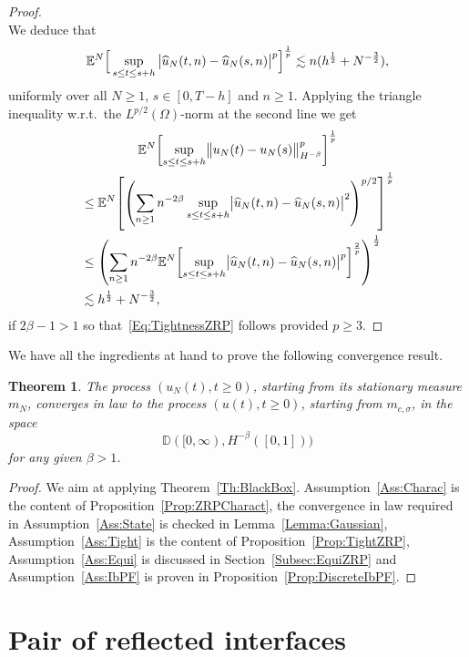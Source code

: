 \documentclass[10pt]{amsart}
\newtheorem{theo}{Theorem}[section]
\theoremstyle{definition}\newtheorem{defi}[theo]{Definition}\newtheorem{rema}[theo]{Remark}\newtheorem{exam}[theo]{Example}\newtheorem{exem}[theo]{Example}\newtheorem{nota}[theo]{Notation}
\theoremstyle{plain}
\newcommand{\bbD}{\mathbb{D}}
\newcommand{\bbE}{\mathbb{E}}
\let\oldhat\hat
\renewcommand*{\hat}[1]{\mathchoice{\widehat{#1}}{\widehat{#1}}{\oldhat{#1}}{\oldhat{#1}}}
\let\originalleft\left
\let\originalright\right
\renewcommand{\left}{\mathopen{}\mathclose\bgroup\originalleft}
\renewcommand{\right}{\aftergroup\egroup\originalright}
\begin{document}
\begin{proof}
\[\]
We deduce that
\begin{equation*}
\bbE^N \Big[\sup_{s\leq t \leq s+h} \big|\hat{u}_N(t,n)-\hat{u}_N(s,n)\big|^p\Big]^{\frac{1}{p}} \lesssim n(h^{\frac{1}{2}} + N^{-\frac{3}{2}}),
\end{equation*}
uniformly over all $N\geq 1$, $s\in [0,T-h]$ and $n\geq 1$. Applying the triangle inequality w.r.t.~the $L^{p/2}(\Omega)$-norm at the second line we get
\begin{multline*}
\bbE^N \left[\sup_{s\leq t \leq s+h} \bigl\|u_N(t)-u_N(s)\bigr\|^p_{H^{-\beta}}\right]^{\frac{1}{p}}\\
\begin{aligned} 
&\leq \bbE^N \left[\left(\sum_{n\geq 1} n^{-2\beta}\sup_{s\leq t \leq s+h} \bigl|\hat{u}_N(t,n)-\hat{u}_N(s,n)\bigr|^{2}\right)^{p/2}\right]^{\frac{1}{p}}\\
&\leq \left(\sum_{n\geq 1} n^{-2\beta} \bbE^N \left[\sup_{s\leq t \leq s+h} \bigl|\hat{u}_N(t,n)-\hat{u}_N(s,n)\bigr|^{p}\right]^{\frac{2}{p}}\right)^{\frac{1}{2}}\\
&\lesssim h^{\frac{1}{2}} + N^{-\frac{3}{2}},
\end{aligned}
\end{multline*}
if $2\beta-1>1$ so that~\eqref{Eq:TightnessZRP} follows provided $p\ge 3$.
\end{proof}

We have all the ingredients at hand to prove the following convergence result.


\begin{theo}\label{Th:ZRP}
The process $(u_N(t), t\ge 0)$, starting from its stationary measure $m_N$, converges in law to the process $(u(t),t\ge 0)$, starting from $m_{c,\sigma}$, in the space
\[
\bbD([0,\infty),H^{-\beta}([0,1]))
\]
for any given $\beta > 1$.
\end{theo}

\begin{proof}
We aim at applying Theorem~\ref{Th:BlackBox}. Assumption~\ref{Ass:Charac} is the content of Proposition~\ref{Prop:ZRPCharact}, the convergence in law required in Assumption~\ref{Ass:State} is checked in Lemma~\ref{Lemma:Gaussian}, Assumption~\ref{Ass:Tight} is the content of Proposition~\ref{Prop:TightZRP}, Assumption~\ref{Ass:Equi} is discussed in Section~\ref{Subsec:EquiZRP} and Assumption~\ref{Ass:IbPF} is proven in Proposition~\ref{Prop:DiscreteIbPF}.
\end{proof}


\section{Pair of reflected interfaces}\label{Sec:Reflected}
\end{document}
